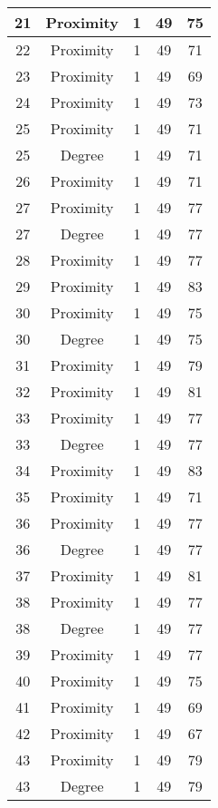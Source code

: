 \documentclass[results.tex]{subfiles}
\begin{document}
\begin{center}
\begin{tabular}{| c || c | c | c | c |}
    \hline
    21 & Proximity & 1 & 49 & 75 \\ 
    \hline
    22 & Proximity & 1 & 49 & 71 \\ 
    \hline
    23 & Proximity & 1 & 49 & 69 \\ 
    \hline
    24 & Proximity & 1 & 49 & 73 \\ 
    \hline
    25 & Proximity & 1 & 49 & 71 \\ 
    \hline
    25 & Degree & 1 & 49 & 71 \\ 
    \hline
    26 & Proximity & 1 & 49 & 71 \\ 
    \hline
    27 & Proximity & 1 & 49 & 77 \\ 
    \hline
    27 & Degree & 1 & 49 & 77 \\ 
    \hline
    28 & Proximity & 1 & 49 & 77 \\ 
    \hline
    29 & Proximity & 1 & 49 & 83 \\ 
    \hline
    30 & Proximity & 1 & 49 & 75 \\ 
    \hline
    30 & Degree & 1 & 49 & 75 \\ 
    \hline
    31 & Proximity & 1 & 49 & 79 \\ 
    \hline
    32 & Proximity & 1 & 49 & 81 \\ 
    \hline
    33 & Proximity & 1 & 49 & 77 \\ 
    \hline
    33 & Degree & 1 & 49 & 77 \\ 
    \hline
    34 & Proximity & 1 & 49 & 83 \\ 
    \hline
    35 & Proximity & 1 & 49 & 71 \\ 
    \hline
    36 & Proximity & 1 & 49 & 77 \\ 
    \hline
    36 & Degree & 1 & 49 & 77 \\ 
    \hline
    37 & Proximity & 1 & 49 & 81 \\ 
    \hline
    38 & Proximity & 1 & 49 & 77 \\ 
    \hline
    38 & Degree & 1 & 49 & 77 \\ 
    \hline
    39 & Proximity & 1 & 49 & 77 \\ 
    \hline
    40 & Proximity & 1 & 49 & 75 \\ 
    \hline
    41 & Proximity & 1 & 49 & 69 \\ 
    \hline
    42 & Proximity & 1 & 49 & 67 \\ 
    \hline
    43 & Proximity & 1 & 49 & 79 \\ 
    \hline
    43 & Degree & 1 & 49 & 79 \\ 

\end{tabular}
\end{center}
\end{document}

